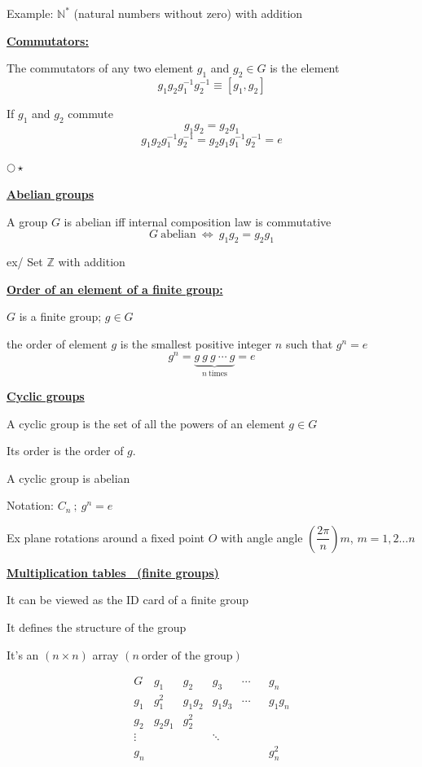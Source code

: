 \documentclass[12pt,a4paper]{article}
\newcommand{\heading}[1]{\par\vspace{0.2em}\underline{\textbf{#1}}\par\vspace{0.15em}}
\newcommand{\starheading}[1]{\par\vspace{0.18em}\(\bigcirc\!\star\)\quad\heading{#1}}
\begin{document}
Example: \(\mathbb{N}^{*}\) (natural numbers without zero) with addition

\heading{Commutators:}

The commutators of any two element \(g_1\) and \(g_2\in G\) is the element
\[
g_1g_2g_1^{-1}g_2^{-1}\equiv[g_1,g_2]
\]

If \(g_1\) and \(g_2\) commute
\[
g_1g_2=g_2g_1
\]
\[
g_1g_2g_1^{-1}g_2^{-1}=g_2g_1g_1^{-1}g_2^{-1}=e
\]

\starheading{Abelian groups}

A group \(G\) is abelian iff internal composition law is commutative
\[
G\ \text{abelian}\ \Longleftrightarrow\ g_1g_2=g_2g_1
\]

ex/ Set \(\mathbb{Z}\) with addition

\heading{Order of an element of a finite group:}

\(G\) is a finite group; \(g\in G\)

the order of element \(g\) is the smallest positive integer \(n\) such that \(g^n=e\)
\[
g^n=\underbrace{g\ g\ g\ \cdots\ g}_{n\ \text{times}}=e
\]

\newpage

\heading{Cyclic groups}

A cyclic group is the set of all the powers of an element \(g\in G\)

Its order is the order of \(g\).

A cyclic group is abelian

Notation: \(C_n\ ;\ g^n=e\)

Ex \quad plane rotations around a fixed point \(O\) with angle angle \(\left(\dfrac{2\pi}{n}\right)m\), \(m=1,2\ldots n\)
\hfill
{}

\heading{Multiplication tables \ (finite groups)}

It can be viewed as the ID card of a finite group

It defines the structure of the group

It's an \((n\times n)\) array \((n\ \text{order of the group})\)

\[
\begin{array}{c|cccccc}
G & g_1 & g_2 & g_3 & \cdots & & g_n\\ \hline
g_1 & g_1^2 & g_1g_2 & g_1g_3 & \cdots & & g_1g_n\\
g_2 & g_2g_1 & g_2^2 & & & &\\
\vdots & & & \ddots & & &\\
g_n & & & & & & g_n^2
\end{array}
\]
\end{document}
